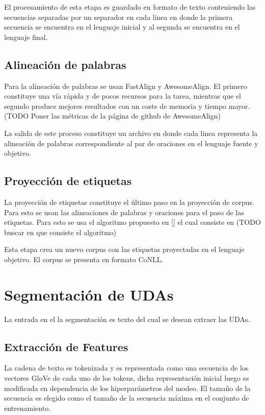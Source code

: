 El procesamiento de esta etapa es guardado en formato de texto conteniendo las 
secuencias separadas por un separador en cada linea en donde la primera secuencia se
encuentra en el lenguaje inicial y al segunda se encuentra en el lenguaje final.

\subsection{Alineación de palabras}

Para la alineación de palabras se usan FastAlign y AwesomeAlign. El primero constituye
una vía rápida y de pocos recursos para la tarea, mientras que el segundo produce mejores
resultados con un coste de memoria y tiempo mayor. (TODO Poner las métricas de la página de
github de AwesomeAlign)

La salida de este proceso constituye un archivo en donde cada linea representa la 
alineación de palabras correspondiente al par de oraciones en el lenguaje fuente y objetivo. 

\subsection{Proyección de etiquetas}

La proyección de etiquetas constituye el último paso en la proyección de corpus. Para esto
se usan las alineaciones de palabras y oraciones para el paso de las etiquetas. Para esto
se usa el algoritmo propuesto en [\cite{eger2018cross}] el cual consiste en (TODO buscar en
que consiste el algoritmo)

Esta etapa crea un nuevo corpus con las etiquetas proyectadas en el lenguaje objetivo. El 
corpus se presenta en formato CoNLL.

\section{Segmentación de UDAs}

La entrada en el la segmentación es texto del cual se desean extraer las UDAs.

\subsection{Extracción de Features}

La cadena de texto es tokenizada y es representada como una secuencia 
de los vectores GloVe de cada uno de los tokens, dicha representación inicial 
luego es modificada en dependencia de los hiperparámetros del modeo. 
El tamaño de la secuencia es elegido como el tamaño de la secuencia máxima en el 
conjunto de entrenamiento.

